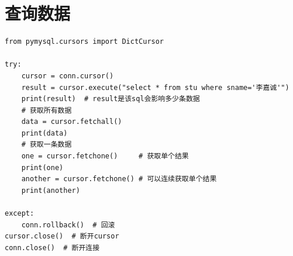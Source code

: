 \section{查询数据}
\begin{lstlisting}[style=demostyle,numbers=none]
from pymysql.cursors import DictCursor

try:
    cursor = conn.cursor()
    result = cursor.execute("select * from stu where sname='李嘉诚'")
    print(result)  # result是该sql会影响多少条数据
    # 获取所有数据
    data = cursor.fetchall()
    print(data)
    # 获取一条数据
    one = cursor.fetchone()     # 获取单个结果
    print(one)
    another = cursor.fetchone() # 可以连续获取单个结果
    print(another)

except:
    conn.rollback()  # 回滚
cursor.close()  # 断开cursor
conn.close()  # 断开连接
\end{lstlisting}
